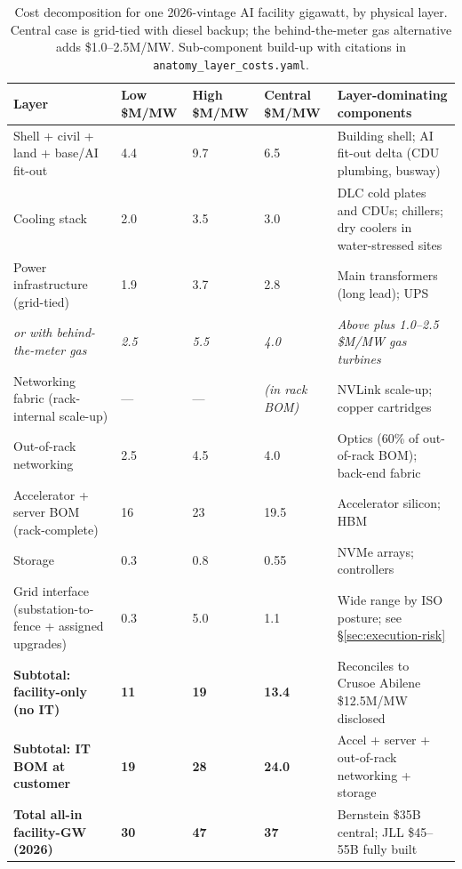 \documentclass[11pt,a4paper]{article}
\begin{document}
\begin{table}[h]
\centering
\small
\begin{tabular}{@{}L{4.6cm}R{1.5cm}R{1.5cm}R{1.6cm}L{4.4cm}@{}}
\toprule
\textbf{Layer} & \textbf{Low \$M/MW} & \textbf{High \$M/MW} & \textbf{Central \$M/MW} & \textbf{Layer-dominating components} \\
\midrule
Shell + civil + land + base/AI fit-out & 4.4 & 9.7 & 6.5 & Building shell; AI fit-out delta (CDU plumbing, busway) \\
Cooling stack & 2.0 & 3.5 & 3.0 & DLC cold plates and CDUs; chillers; dry coolers in water-stressed sites \\
Power infrastructure (grid-tied) & 1.9 & 3.7 & 2.8 & Main transformers (long lead); UPS \\
\quad\emph{or with behind-the-meter gas} & \emph{2.5} & \emph{5.5} & \emph{4.0} & \emph{Above plus 1.0--2.5 \$M/MW gas turbines} \\
Networking fabric (rack-internal scale-up) & --- & --- & \emph{(in rack BOM)} & NVLink scale-up; copper cartridges \\
Out-of-rack networking & 2.5 & 4.5 & 4.0 & Optics (60\% of out-of-rack BOM); back-end fabric \\
Accelerator + server BOM (rack-complete) & 16 & 23 & 19.5 & Accelerator silicon; HBM \\
Storage & 0.3 & 0.8 & 0.55 & NVMe arrays; controllers \\
Grid interface (substation-to-fence + assigned upgrades) & 0.3 & 5.0 & 1.1 & Wide range by ISO posture; see \S\ref{sec:execution-risk} \\
\midrule
\textbf{Subtotal: facility-only (no IT)} & \textbf{11} & \textbf{19} & \textbf{13.4} & Reconciles to Crusoe Abilene \$12.5M/MW disclosed \\
\textbf{Subtotal: IT BOM at customer} & \textbf{19} & \textbf{28} & \textbf{24.0} & Accel + server + out-of-rack networking + storage \\
\textbf{Total all-in facility-GW (2026)} & \textbf{30} & \textbf{47} & \textbf{37} & Bernstein \$35B central; JLL \$45--55B fully built \\
\bottomrule
\end{tabular}
\caption{Cost decomposition for one 2026-vintage AI facility gigawatt, by physical layer. Central case is grid-tied with diesel backup; the behind-the-meter gas alternative adds \$1.0--2.5M/MW. Sub-component build-up with citations in \texttt{anatomy\_layer\_costs.yaml}.}
\label{tab:layer-bom}
\end{table}
\end{document}
